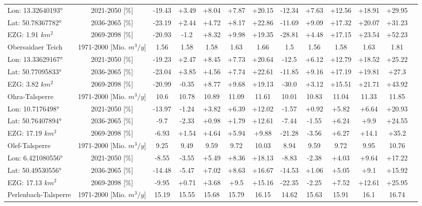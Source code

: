 \begin{longtable}{@{\extracolsep{\fill}}lc|ccccc||cccccc}
\cline{2-13} 
Lon: 13.32640193° & 2021-2050 [\%]  & -19.43 & +3.49 & +8.04 & +7.87 & +20.15 & -12.34 & +7.63 & +12.56 & +18.91 & +29.95 & \\ 
Lat: 50.78367782° & 2036-2065 [\%]  & -23.19 & +2.44 & +4.72 & +8.17 & +22.86 & -11.69 & +9.09 & +17.32 & +20.07 & +31.23 & \\ 
EZG: 1.91 $km^2$ & 2069-2098 [\%]  & -20.93 & -1.2 & +8.32 & +9.98 & +19.35 & -28.81 & +4.48 & +17.15 & +23.54 & +52.23 & \\ 
\hline 
Obersaidaer Teich & 1971-2000 [Mio. $m^3/y$]  & 1.56 & 1.58 & 1.58 & 1.63 & 1.66 & 1.5 & 1.56 & 1.58 & 1.63 & 1.81 & \\ 
\cline{2-13} 
Lon: 13.33629167° & 2021-2050 [\%]  & -19.23 & +2.47 & +8.45 & +7.73 & +20.64 & -12.5 & +6.12 & +12.79 & +18.52 & +25.22 & \\ 
Lat: 50.77095833° & 2036-2065 [\%]  & -23.04 & +3.85 & +4.56 & +7.74 & +22.61 & -11.85 & +9.16 & +17.19 & +19.81 & +27.3 & \\ 
EZG: 3.82 $km^2$ & 2069-2098 [\%]  & -20.99 & -0.35 & +8.77 & +9.68 & +19.13 & -30.0 & +3.12 & +15.51 & +21.71 & +43.92 & \\ 
\hline 
Ohra-Talsperre & 1971-2000 [Mio. $m^3/y$]  & 10.6 & 10.78 & 10.89 & 11.09 & 11.61 & 10.01 & 10.83 & 11.04 & 11.33 & 11.85 & \\ 
\cline{2-13} 
Lon: 10.7176498° & 2021-2050 [\%]  & -13.97 & -1.24 & +3.82 & +6.39 & +12.02 & -1.57 & +0.92 & +5.82 & +6.64 & +20.93 & \\ 
Lat: 50.76407894° & 2036-2065 [\%]  & -9.7 & -2.33 & +0.98 & +1.79 & +12.61 & -7.44 & -1.55 & +6.24 & +9.9 & +24.55 & \\ 
EZG: 17.19 $km^2$ & 2069-2098 [\%]  & -6.93 & +1.54 & +4.64 & +5.94 & +9.88 & -21.28 & -3.56 & +6.27 & +14.1 & +35.2 & \\ 
\hline 
Olef-Talsperre & 1971-2000 [Mio. $m^3/y$]  & 9.25 & 9.49 & 9.59 & 9.72 & 10.03 & 8.94 & 9.59 & 9.72 & 9.95 & 10.76 & \\ 
\cline{2-13} 
Lon: 6.421080556° & 2021-2050 [\%]  & -8.55 & -3.55 & +5.49 & +8.36 & +18.13 & -8.83 & -2.38 & +4.03 & +9.64 & +17.22 & \\ 
Lat: 50.49530556° & 2036-2065 [\%]  & -14.48 & -5.47 & +7.02 & +8.63 & +16.67 & -14.53 & +1.06 & +5.05 & +9.1 & +15.92 & \\ 
EZG: 17.13 $km^2$ & 2069-2098 [\%]  & -9.95 & +0.71 & +3.68 & +9.5 & +15.16 & -22.35 & -2.25 & +7.52 & +12.61 & +25.95 & \\ 
\hline 
Perlenbach-Talsperre & 1971-2000 [Mio. $m^3/y$]  & 15.19 & 15.55 & 15.68 & 15.79 & 16.15 & 14.62 & 15.63 & 15.91 & 16.1 & 16.74 & \\ 

\end{longtable}

